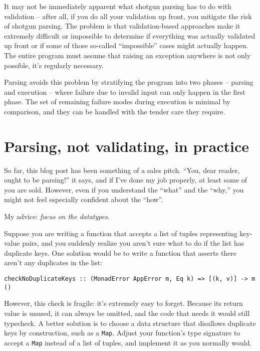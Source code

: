 It may not be immediately apparent what shotgun parsing has to do with validation -- after all, if you do all your validation up front, you mitigate the risk of shotgun parsing. The problem is that validation-based approaches make it extremely difficult or impossible to determine if everything was actually validated up front or if some of those so-called ``impossible'' cases might actually happen. The entire program must assume that raising an exception anywhere is not only possible, it's regularly necessary.

Parsing avoids this problem by stratifying the program into two phases -- parsing and execution -- where failure due to invalid input can only happen in the first phase. The set of remaining failure modes during execution is minimal by comparison, and they can be handled with the tender care they require.



\section{Parsing, not validating, in practice}


So far, this blog post has been something of a sales pitch. ``You, dear reader, ought to be parsing!'' it says, and if I've done my job properly, at least some of you are sold. However, even if you understand the ``what'' and the ``why,'' you might not feel especially confident about the ``how''.

\vspace{\baselineskip}

\noindent My advice: \textit{focus on the datatypes.}

\vspace{\baselineskip}

Suppose you are writing a function that accepts a list of tuples representing key-value pairs, and you suddenly realize you aren't sure what to do if the list has duplicate keys. One solution would be to write a function that asserts there aren't any duplicates in the list:

\begin{verbatim}
checkNoDuplicateKeys :: (MonadError AppError m, Eq k) => [(k, v)] -> m ()
\end{verbatim}
However, this check is fragile: it's extremely easy to forget. Because its return value is unused, it can always be omitted, and the code that needs it would still typecheck. A better solution is to choose a data structure that disallows duplicate keys by construction, such as a \texttt{Map}. Adjust your function's type signature to accept a \texttt{Map} instead of a list of tuples, and implement it as you normally would.

